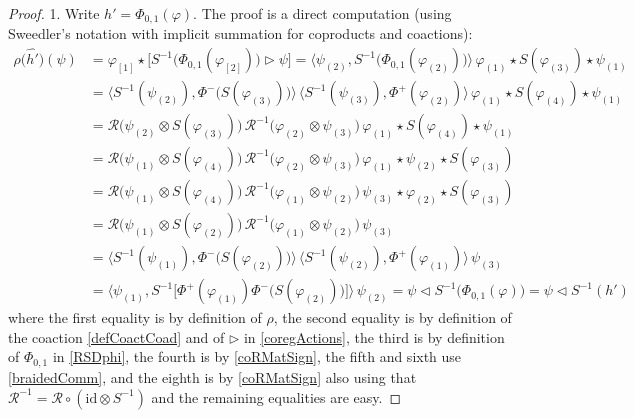 \documentclass[11pt]{amsart}
\begin{document}
\begin{proof}
1. Write $h' = \Phi_{0,1}(\varphi)$. The proof is a direct computation (using Sweedler's notation with implicit summation for coproducts and coactions):
\begin{align*}
\rho\bigl( \widehat{h'} \bigr)(\psi) &= \varphi_{[1]} \star \bigl[ S^{-1}\bigl( \Phi_{0,1}(\varphi_{[2]})  \bigr) \rhd \psi \bigr] = \bigl\langle \psi_{(2)}, S^{-1}\bigl( \Phi_{0,1}(\varphi_{(2)}) \bigr) \bigr\rangle \, \varphi_{(1)} \star S(\varphi_{(3)}) \star \psi_{(1)}\\
&=\bigl\langle S^{-1}(\psi_{(2)}), \Phi^-\bigl( S(\varphi_{(3)}) \bigr) \bigr\rangle \, \bigl\langle S^{-1}(\psi_{(3)}), \Phi^+(\varphi_{(2)}) \bigr\rangle \, \varphi_{(1)} \star S(\varphi_{(4)}) \star \psi_{(1)}\\
&=\mathcal{R}\bigl( \psi_{(2)} \otimes S(\varphi_{(3)}) \bigr) \, \mathcal{R}^{-1}\bigl( \varphi_{(2)} \otimes \psi_{(3)} \bigr) \, \varphi_{(1)} \star S(\varphi_{(4)}) \star \psi_{(1)}\\
&=\mathcal{R}\bigl( \psi_{(1)} \otimes S(\varphi_{(4)}) \bigr) \, \mathcal{R}^{-1}\bigl( \varphi_{(2)} \otimes \psi_{(3)} \bigr) \, \varphi_{(1)} \star \psi_{(2)} \star S(\varphi_{(3)})\\
&=\mathcal{R}\bigl( \psi_{(1)} \otimes S(\varphi_{(4)}) \bigr) \, \mathcal{R}^{-1}\bigl( \varphi_{(1)} \otimes \psi_{(2)} \bigr) \, \psi_{(3)} \star \varphi_{(2)} \star S(\varphi_{(3)})\\
&=\mathcal{R}\bigl( \psi_{(1)} \otimes S(\varphi_{(2)}) \bigr) \, \mathcal{R}^{-1}\bigl( \varphi_{(1)} \otimes \psi_{(2)} \bigr) \, \psi_{(3)}\\
&=\bigl\langle S^{-1}(\psi_{(1)}), \Phi^-\bigl( S(\varphi_{(2)}) \bigr) \bigr\rangle \, \bigl\langle S^{-1}(\psi_{(2)}), \Phi^+(\varphi_{(1)}) \bigr\rangle \, \psi_{(3)}\\
&=\bigl\langle \psi_{(1)}, S^{-1}\bigl[ \Phi^+(\varphi_{(1)}) \Phi^-\bigl( S(\varphi_{(2)}) \bigr) \bigr] \bigr\rangle \, \psi_{(2)} = \psi \lhd S^{-1}\bigl( \Phi_{0,1}(\varphi) \bigr) = \psi \lhd S^{-1}(h')
\end{align*}
where the first equality is by definition of $\rho$, the second equality is by definition of the coaction \eqref{defCoactCoad} and of $\rhd$ in \eqref{coregActions}, the third is by definition of $\Phi_{0,1}$ in \eqref{RSDphi}, the fourth is by \eqref{coRMatSign}, the fifth and sixth use \eqref{braidedComm}, and the eighth is by \eqref{coRMatSign} also using that $\mathcal{R}^{-1} = \mathcal{R} \circ (\mathrm{id} \otimes S^{-1})$ and the remaining equalities are easy.

\end{proof}
\end{document}
